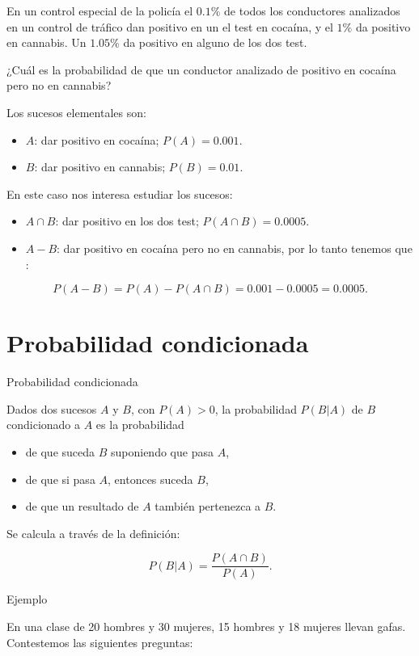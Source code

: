 \documentclass[
  letterpaper,
  DIV=11,
  numbers=noendperiod]{scrreprt}
\providecommand{\tightlist}{%
  \setlength{\itemsep}{0pt}\setlength{\parskip}{0pt}}\usepackage{longtable,booktabs,array}
\begin{document}
En un control especial de la policía el \(0.1\%\) de todos los
conductores analizados en un control de tráfico dan positivo en un el
test en cocaína, y el \(1\%\) da positivo en cannabis. Un \(1.05\%\) da
positivo en alguno de los dos test.

¿Cuál es la probabilidad de que un conductor analizado de positivo en
cocaína pero no en cannabis?

Los sucesos elementales son:

\begin{itemize}
\tightlist
\item
  \(A\): dar positivo en cocaína; \(P(A)=0.001.\)
\item
  \(B\): dar positivo en cannabis; \(P(B)=0.01.\)
\end{itemize}

En este caso nos interesa estudiar los sucesos:

\begin{itemize}
\tightlist
\item
  \(A\cap B\): dar positivo en los dos test; \(P(A\cap B)=0.0005.\)
\item
  \(A-B\): dar positivo en cocaína pero no en cannabis, por lo tanto
  tenemos que :
\end{itemize}

\[P(A-B) =P(A)-P(A\cap B) =0.001-0.0005=0.0005.\]

\section{Probabilidad condicionada}\label{probabilidad-condicionada}

Probabilidad condicionada

Dados dos sucesos \(A\) y \(B\), con \(P(A)>0\), la probabilidad
\(P(B|A)\) de \(B\) condicionado a \(A\) es la probabilidad

\begin{itemize}
\tightlist
\item
  de que suceda \(B\) suponiendo que pasa \(A\),
\item
  de que si pasa \(A\), entonces suceda \(B\),
\item
  de que un resultado de \(A\) también pertenezca a \(B\).
\end{itemize}

Se calcula a través de la definición:

\[
P(B|A)=\frac{P(A\cap B)}{P(A)}.
\]

Ejemplo

En una clase de 20 hombres y 30 mujeres, 15 hombres y 18 mujeres llevan
gafas. Contestemos las siguientes preguntas:
\end{document}

